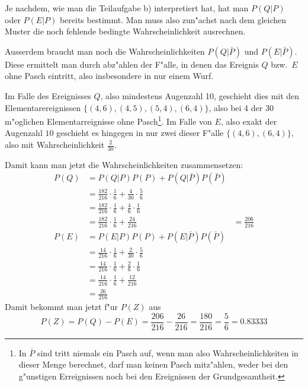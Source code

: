 \begin{loesung}
\begin{teilaufgaben}
Je nachdem, wie man die Teilaufgabe b) interpretiert hat, hat man $P(Q|P)$
oder $P(E|P)$ bereits bestimmt. Man muss also zun"achst nach dem gleichen
Muster die noch fehlende bedingte Wahrscheinlichkeit ausrechnen.

Ausserdem braucht man noch die Wahrscheinlichkeiten $P(Q|\bar P)$ und
$P(E|\bar P)$. Diese ermittelt man durch abz"ahlen der F"alle, in denen
das Ereignis $Q$ bzw.~$E$ ohne Pasch eintritt, also insbesondere in nur
einem Wurf.

Im Falle des Ereignisses $Q$, also mindestens Augenzahl 10, geschieht dies
mit den Elementarereignissen $\{(4,6),(4,5),(5,4),(6,4)\}$, also bei 4 der 30
m"oglichen Elementarreignisse ohne Pasch\footnote{In $\bar P$ sind tritt
niemals ein Pasch auf, wenn man also Wahrscheinlichkeiten in dieser Menge
berechnet, darf man keinen Pasch mitz"ahlen, weder bei den
g"unstigen Erreignissen noch bei den Ereignissen der Grundgesamtheit.}.
Im Falle von $E$, also exakt
der Augenzahl $10$ geschieht es hingegen in nur zwei dieser
F"alle $\{(4,6), (6,4)\}$, also mit Wahrscheinlichkeit $\frac{2}{30}$.

Damit kann man jetzt die Wahrscheinlichkeiten zusammensetzen:
\begin{align*}
P(Q)&=P(Q|P)P(P) + P(Q|\bar P)P(\bar P)\\
    &=\frac{182}{216}\cdot\frac16 + \frac4{30}\cdot\frac56\\
    &=\frac{182}{216}\cdot\frac16 + \frac4{6}\cdot\frac16\\
    &=\frac{182}{216}\cdot\frac16 + \frac{24}{216}
    &=\frac{206}{216}\\
P(E)&=P(E|P)P(P) + P(E|\bar P)P(\bar P)\\
    &=\frac{14}{216}\cdot\frac16 + \frac2{30}\cdot\frac56\\
    &=\frac{14}{216}\cdot\frac16 + \frac2{6}\cdot\frac16\\
    &=\frac{14}{216}\cdot\frac16 + \frac{12}{216}\\
    &=\frac{26}{216}
\end{align*}
Damit bekommt man jetzt f"ur $P(Z)$ aus
\[
P(Z)=P(Q)-P(E)
=
    \frac{206}{216}
    -\frac{26}{216}
=\frac{180}{216}=\frac56=0.83333
\]
\end{teilaufgaben}

\end{loesung}

